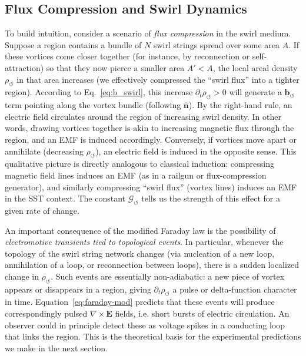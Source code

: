 \documentclass[12pt]{article}
\begin{document}
    \subsection*{Flux Compression and Swirl Dynamics}
        To build intuition, consider a scenario of \emph{flux compression} in the swirl medium. Suppose a region contains a bundle of $N$ swirl strings spread over some area $A$. If these vortices come closer together (for instance, by reconnection or self-attraction) so that they now pierce a smaller area $A' < A$, the local areal density $\rho_{\!\boldsymbol{\circlearrowleft}}$ in that area increases (we effectively compressed the ``swirl flux'' into a tighter region). According to Eq.~\eqref{eq:b_swirl}, this increase $\partial_t \rho_{\!\boldsymbol{\circlearrowleft}}>0$ will generate a $\mathbf{b}_{\!\boldsymbol{\circlearrowleft}}$ term pointing along the vortex bundle (following $\hat{\mathbf{n}}$). By the right-hand rule, an electric field circulates around the region of increasing swirl density. In other words, drawing vortices together is akin to increasing magnetic flux through the region, and an EMF is induced accordingly. Conversely, if vortices move apart or annihilate (decreasing $\rho_{\!\boldsymbol{\circlearrowleft}}$), an electric field is induced in the opposite sense. This qualitative picture is directly analogous to classical induction: compressing magnetic field lines induces an EMF (as in a railgun or flux-compression generator), and similarly compressing ``swirl flux'' (vortex lines) induces an EMF in the SST context. The constant $\mathcal{G}_{\!\boldsymbol{\circlearrowleft}}$ tells us the strength of this effect for a given rate of change.

        An important consequence of the modified Faraday law is the possibility of \emph{electromotive transients tied to topological events}. In particular, whenever the topology of the swirl string network changes (via nucleation of a new loop, annihilation of a loop, or reconnection between loops), there is a sudden localized change in $\rho_{\!\boldsymbol{\circlearrowleft}}$. Such events are essentially non-adiabatic: a new piece of vortex appears or disappears in a region, giving $\partial_t \rho_{\!\boldsymbol{\circlearrowleft}}$ a pulse or delta-function character in time. Equation~\eqref{eq:faraday-mod} predicts that these events will produce correspondingly pulsed $\nabla \times \mathbf{E}$ fields, i.e. short bursts of electric circulation. An observer could in principle detect these as voltage spikes in a conducting loop that links the region. This is the theoretical basis for the experimental predictions we make in the next section.
\end{document}
